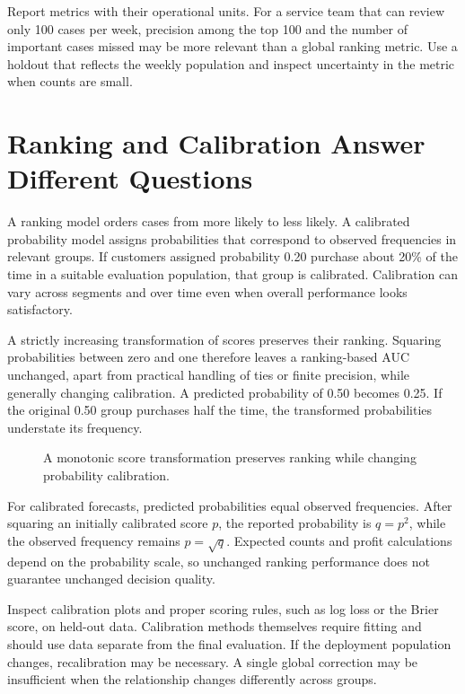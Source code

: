 Report metrics with their operational units. For a service team that can
review only 100 cases per week, precision among the top 100 and the
number of important cases missed may be more relevant than a global
ranking metric. Use a holdout that reflects the weekly population and
inspect uncertainty in the metric when counts are small.

\hypertarget{M07-ranking-and-calibration-answer-different-questions}{%
\section{Ranking and Calibration Answer Different
Questions}\label{M07-ranking-and-calibration-answer-different-questions}}

\noindent A ranking model orders cases from more likely to less likely. A
calibrated probability model assigns probabilities that correspond to
observed frequencies in relevant groups. If customers assigned
probability 0.20 purchase about 20\% of the time in a suitable
evaluation population, that group is calibrated. Calibration can vary
across segments and over time even when overall performance looks
satisfactory.

A strictly increasing transformation of scores preserves their ranking.
Squaring probabilities between zero and one therefore leaves a
ranking-based AUC unchanged, apart from practical handling of ties or
finite precision, while generally changing calibration. A predicted
probability of 0.50 becomes 0.25. If the original 0.50 group purchases
half the time, the transformed probabilities understate its frequency.

\begin{figure}[htbp]
\centering

\caption{A monotonic score transformation preserves ranking while changing probability calibration.}\label{fig:M07_calibration}
\end{figure}

For calibrated forecasts, predicted probabilities equal observed
frequencies. After squaring an initially calibrated score \(p\), the
reported probability is \(q=p^2\), while the observed frequency remains
\(p=\sqrt{q}\). Expected counts and profit calculations depend on the
probability scale, so unchanged ranking performance does not guarantee
unchanged decision quality.

Inspect calibration plots and proper scoring rules, such as log loss or
the Brier score, on held-out data. Calibration methods themselves
require fitting and should use data separate from the final evaluation.
If the deployment population changes, recalibration may be necessary. A
single global correction may be insufficient when the relationship
changes differently across groups.

